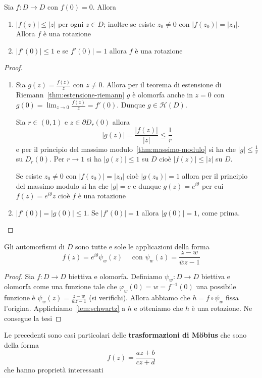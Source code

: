 \begin{lemmao}[Schwartz]\label{lem:schwartz}
    Sia \(f : D \to D\) con \(f{(0)} = 0\). Allora 
\begin{enumerate}[label = \alph*.]
    \item \(|f{(z)}| \le |z|\) per ogni \(z \in D\); inoltre se esiste \(z_{0}
        \neq 0\) con \(|f{(z_{0})}| = |z_{0}|\). Allora \(f\) è una rotazione
    \item \(|f'{(0)}| \le 1\) e se \(f'{(0)}| = 1\) allora \(f\) è una rotazione
\end{enumerate}
\end{lemmao}
\begin{proof}
\begin{enumerate}[label = \alph*.]
    \item Sia \(g{(z)} = \frac{f{(z)}}{z}\) con \(z \neq 0\). Allora per il
        teorema di estensione di Riemann~\ref{thm:estensione-riemann} \(g\) è
        olomorfa anche in \(z=0\) con \(g{(0)} = \lim_{z \to 0} \frac{f{(z)}}{z}
        = f'{(0)}\). Dunque \(g \in \mathcal{H}{(D)}\).

        Sia \(r \in {(0, 1)}\) e \(z \in \partial D_r{(0)}\) allora
        \[
          |g{(z)}| = \frac{|f{(z)}|}{|z|} \le \frac{1}{r}
      \]
      e per il principio del massimo modulo~\ref{thm:massimo-modulo} si ha che
      \(|g| \le \frac{1}{r}\) su \(D_r{(0)}\). Per \(r\to 1\) si ha \(|g{(z)}|
      \le 1\) su \(D\) cioè \(|f{(z)}| \le |z|\) su \(D\).

      Se esiste \(z_{0} \neq 0\) con \(|f{(z_0)}| = |z_{0}|\) cioè
      \(|g{(z_{0})}| = 1\) allora per il principio del massimo modulo si ha che
      \(|g| = c \) e dunque \(g{(z)} = e^{i\theta}\) per cui \(f{(z)} =
      e^{i\theta} z\) cioè \(f\) è una rotazione
    \item \(|f'{(0)}| = |g{(0)}| \le  1\). Se \(|f'{(0)}| = 1\) allora
        \(|g{(0)}| = 1\), come prima.
\end{enumerate}
\end{proof}

\begin{theorem}
    Gli automorfismi di \(D\) sono tutte e sole le applicazioni della forma 
    \[
        f{(z)} = e^{i\theta} \psi_w{(z)} \quad \text{ con } \psi_w{(z)} =
        \frac{z-w}{\overline{w}z - 1}
    \]
\end{theorem}
\begin{proof}
Sia \(f : D \to D\) biettiva e olomorfa. Definiamo \(\psi_w : D\to D\) biettiva
e olomorfa come una funzione tale che \(\varphi_w {(0)} = w = f^{-1}({0})\) una
possibile funzione è \(\psi_w{(z)} = \frac{z-w}{\overline{w}z - 1}\) (si
verifichi). Allora abbiamo che \(h = f \circ \psi_w\) fissa l'origina.
Applichiamo~\ref{lem:schwartz} a \(h\) e otteniamo che \(h\) è una rotazione.
Ne consegue la tesi
\end{proof}
Le precedenti sono casi particolari delle \textbf{trasformazioni di Möbius} che
sono della forma
\[
  f{(z)} = \frac{az + b}{cz + d}
\]
che hanno proprietà interessanti


